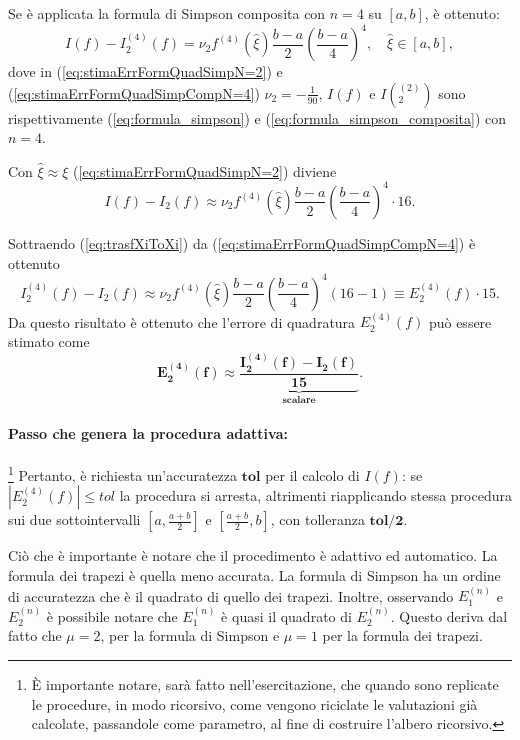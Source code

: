 Se è applicata la formula di Simpson composita con $n=4$ su $[a,b]$, è ottenuto:
\begin{equation}\label{eq:stimaErrFormQuadSimpCompN=4}
    I(f)-I_2^{(4)}(f)=\nu_2 f^{(4)}(\widehat\xi)\frac{b-a}{2}\left(\frac{b-a}{4}\right)^4,\quad \widehat\xi\in[a,b],
\end{equation}
dove in (\ref{eq:stimaErrFormQuadSimpN=2}) e (\ref{eq:stimaErrFormQuadSimpCompN=4}) $\nu_2=-\frac{1}{90}$, $I(f)$ e $I(_2^{(2)})$ sono rispettivamente (\ref{eq:formula_simpson}) e (\ref{eq:formula_simpson_composita}) con $n=4$.

Con $\widehat\xi\approx\xi$ (\ref{eq:stimaErrFormQuadSimpN=2}) diviene
\begin{equation}\label{eq:trasfXiToXi}
    I(f)-I_2(f)\approx\nu_2 f^{(4)}(\widehat\xi)\frac{b-a}{2}\left(\frac{b-a}{4}\right)^4\cdot 16.
\end{equation}

Sottraendo (\ref{eq:trasfXiToXi}) da (\ref{eq:stimaErrFormQuadSimpCompN=4}) è ottenuto
\begin{equation*}
    I_2^{(4)}(f)-I_2(f)\approx\nu_2 f^{(4)}(\widehat\xi)\frac{b-a}{2}\left(\frac{b-a}{4}\right)^4(16-1)\equiv E_2^{(4)}(f)\cdot 15.
\end{equation*}
Da questo risultato è ottenuto che l'errore di quadratura $E_2^{(4)}(f)$ può essere stimato come
\begin{equation}
    \boldsymbol{E_2^{(4)}(f)\approx\underbrace{\frac{I_2^{(4)}(f)-I_2(f)}{15}}_{\text{scalare}}}.
\end{equation}

\paragraph{Passo che genera la procedura adattiva:}

\footnote{È importante notare, sarà fatto nell'esercitazione, che quando sono replicate le procedure, in modo ricorsivo, come vengono riciclate le valutazioni già calcolate, passandole come parametro, al fine di costruire l'albero ricorsivo.}
Pertanto, è richiesta un'accuratezza $\boldsymbol{tol}$ per il calcolo di $I(f)$: se $\left|E_2^{(4)}(f)\right|\leq tol$ la procedura si arresta, altrimenti riapplicando stessa procedura sui due sottointervalli $\left[a,\frac{a+b}{2}\right]$ e $\left[\frac{a+b}{2},b\right]$, con tolleranza $\boldsymbol{tol/2}$.

Ciò che è importante è notare che il procedimento è adattivo ed automatico. La formula dei trapezi è quella meno accurata. La formula di Simpson ha un ordine di accuratezza che è il quadrato di quello dei trapezi.
Inoltre, osservando $E_1^{(n)}$ e $E_2^{(n)}$ è possibile notare che $E_1^{(n)}$ è quasi il quadrato di $E_2^{(n)}$. Questo deriva dal fatto che $\mu=2$, per la formula di Simpson e $\mu=1$ per la formula dei trapezi.


